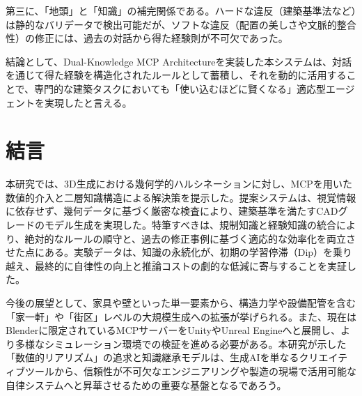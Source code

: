\documentclass{deimj}
\begin{document}
第三に、「地頭」と「知識」の補完関係である。ハードな違反（建築基準法など）は静的なバリデータで検出可能だが、ソフトな違反（配置の美しさや文脈的整合性）の修正には、過去の対話から得た経験則が不可欠であった。

結論として、Dual-Knowledge MCP Architectureを実装した本システムは、対話を通じて得た経験を構造化されたルールとして蓄積し、それを動的に活用することで、専門的な建築タスクにおいても「使い込むほどに賢くなる」適応型エージェントを実現したと言える。

\section{結言}

本研究では、3D生成における幾何学的ハルシネーションに対し、MCPを用いた数値的介入と二層知識構造による解決策を提示した。提案システムは、視覚情報に依存せず、幾何データに基づく厳密な検査により、建築基準を満たすCADグレードのモデル生成を実現した。特筆すべきは、規制知識と経験知識の統合により、絶対的なルールの順守と、過去の修正事例に基づく適応的な効率化を両立させた点にある。実験データは、知識の永続化が、初期の学習停滞（Dip）を乗り越え、最終的に自律性の向上と推論コストの劇的な低減に寄与することを実証した。

今後の展望として、家具や壁といった単一要素から、構造力学や設備配管を含む「家一軒」や「街区」レベルの大規模生成への拡張が挙げられる。また、現在はBlenderに限定されているMCPサーバーをUnityやUnreal Engineへと展開し、より多様なシミュレーション環境での検証を進める必要がある。本研究が示した「数値的リアリズム」の追求と知識継承モデルは、生成AIを単なるクリエイティブツールから、信頼性が不可欠なエンジニアリングや製造の現場で活用可能な自律システムへと昇華させるための重要な基盤となるであろう。




\end{document}
